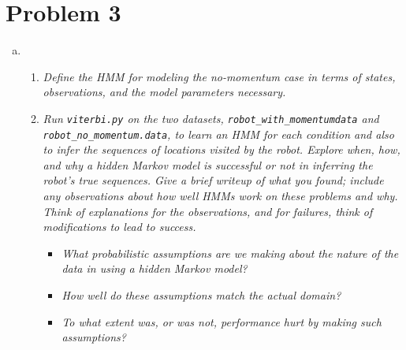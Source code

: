 \documentclass{article}
\begin{document}
\section*{Problem 3}
\begin{enumerate}[(a)]
\setcounter{enumi}2
\item 
  \begin{enumerate}
  \item \emph{Define the HMM for modeling the no-momentum case in terms of 
    states, observations, and the model parameters necessary.}
  \item \emph{Run \emph{\texttt{viterbi.py}} on the two datasets, \emph{\texttt{robot\_with\_momentumdata}}
    and \emph{\texttt{robot\_no\_momentum.data}}, to learn an HMM for each condition and also
    to infer the sequences of locations visited by the robot. Explore when,
    how, and why a hidden Markov model is successful or not in inferring the 
    robot's true sequences. Give a brief writeup of what you found; include any
    observations about how well HMMs work on these problems and why. Think of
    explanations for the observations, and for failures, think of modifications 
    to lead to success.}

    \begin{itemize}
    \item \emph{What probabilistic assumptions are we making about the nature of
      the data in using a hidden Markov model?}

    \item \emph{How well do these assumptions match the actual domain?}

    \item \emph{To what extent was, or was not, performance hurt by making such
      assumptions?}

    \end{itemize}
  \end{enumerate}
\end{enumerate}
\end{document}
